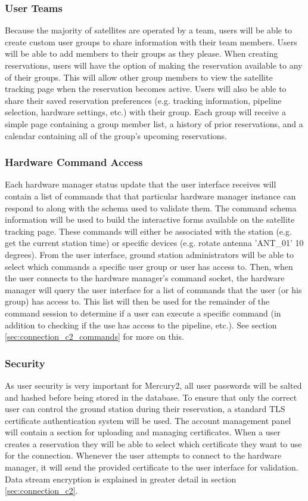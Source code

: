 \documentclass{mxl-design}
\begin{document}
\subsubsection{User Teams}
\label{sec:user_groups}
Because the majority of satellites are operated by a team, users will be able to create custom user groups to share information with their team members. Users will be able to add members to their groups as they please. When creating reservations, users will have the option of making the reservation available to any of their groups. This will allow other group members to view the satellite tracking page when the reservation becomes active. Users will also be able to share their saved reservation preferences (e.g. tracking information, pipeline selection, hardware settings, etc.) with their group. Each group will receive a simple page containing a group member list, a history of prior reservations, and a calendar containing all of the group's upcoming reservations.

\subsubsection{Hardware Command Access}
\label{sec:command_access}
Each hardware manager status update that the user interface receives will contain a list of commands that that particular hardware manager instance can respond to along with the schema used to validate them. The command schema information will be used to build the interactive forms available on the satellite tracking page. These commands will either be associated with the station (e.g. get the current station time) or specific devices (e.g. rotate antenna 'ANT\_01' 10 degrees). From the user interface, ground station administrators will be able to select which commands a specific user group or user has access to. Then, when the user connects to the hardware manager's command socket, the hardware manager will query the user interface for a list of commands that the user (or his group) has access to. This list will then be used for the remainder of the command session to determine if a user can execute a specific command (in addition to checking if the use has access to the pipeline, etc.). See section \ref{sec:connection_c2_commands} for more on this.

\subsubsection{Security}
\label{sec:user_security}
As user security is very important for Mercury2, all user passwords will be salted and hashed before being stored in the database. To ensure that only the correct user can control the ground station during their reservation, a standard TLS certificate authentication system will be used. The account management panel will contain a section for uploading and managing certificates. When a user creates a reservation they will be able to select which certificate they want to use for the connection. Whenever the user attempts to connect to the hardware manager, it will send the provided certificate to the user interface for validation. Data stream encryption is explained in greater detail in section \ref{sec:connection_c2}.
\end{document}

